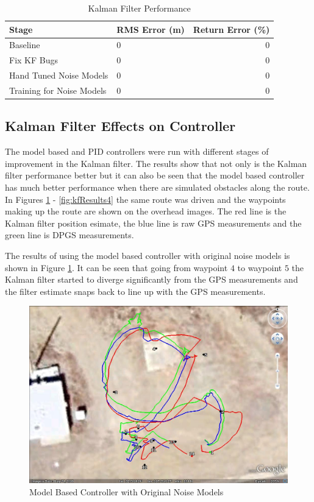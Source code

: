 \begin{table}[ht!]
\caption{Kalman Filter Performance}
\small
\centering
\begin{tabular}{@{}llr@{}} \toprule
Stage                       & RMS Error (m)  & Return Error (\%) \\ \midrule
Baseline                    & 0              & 0                 \\
Fix KF Bugs                 & 0              & 0                 \\
Hand Tuned Noise Models     & 0              & 0                 \\
Training for Noise Models   & 0              & 0                 \\ \bottomrule
\end{tabular}
\label{tab:resultsKF}
\end{table}

\subsection{Kalman Filter Effects on Controller}
The model based and PID controllers were run with different stages of improvement in the Kalman filter. The results show that not only is the Kalman filter performance better but it can also be seen that the model based controller has much better performance when there are simulated obstacles along the route. In Figures \ref{fig:kfResults1} - \ref{fig:kfResults4} the same route was driven and the waypoints making up the route are shown on the overhead images. The red line is the Kalman filter position esimate, the blue line is raw GPS measurements and the green line is DPGS measurements.

The results of using the model based controller with original noise models is shown in Figure \ref{fig:kfResults1}. It can be seen that going from waypoint $4$ to waypoint $5$ the Kalman filter started to diverge significantly from the GPS measurements and the filter estimate snaps back to line up with the GPS measurements.

\begin{figure}[ht!]
	\centering
	\includegraphics[width=.75\textwidth]{images/GE/20101203_1551_kf_lyapOrigQR}
	\caption{Model Based Controller with Original Noise Models}
	\label{fig:kfResults1}
\end{figure}

